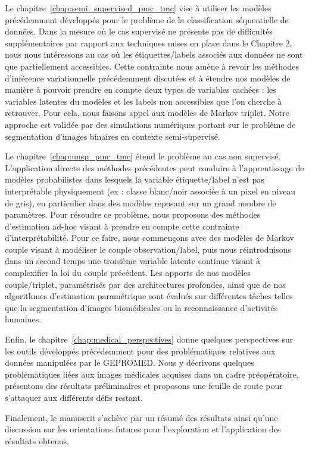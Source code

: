 Le chapitre~\ref{chap:semi_supervised_pmc_tmc}  
vise à utiliser les modèles précédemment développés pour le problème de la
classification séquentielle de données. Dans la mesure où le cas supervisé ne
présente pas de difficultés supplémentaires par rapport aux techniques mises en
place dans le Chapitre 2, nous nous intéressons au cas où les étiquettes/labels
associés aux données ne sont que partiellement accessibles. Cette contrainte
nous amène à revoir les méthodes d'inférence variationnelle précédemment
discutées et à étendre nos modèles de manière à pouvoir prendre en compte deux
types de variables cachées : les variables latentes du modèles et les labels non
accessibles que l'on cherche à retrouver. Pour cela, nous faisons appel aux
modèles de Markov triplet. Notre approche est validée par des simulations
numériques portant sur le problème de segmentation d'images binaires en contexte
semi-supervisé.




Le chapitre~\ref{chap:unsp_pmc_tmc} 
étend le problème au cas non supervisé. L'application directe des méthodes
précédentes peut conduire à l'apprentissage de modèles probabilistes dans
lesquels la variable étiquette/label n'est pas interprétable physiquement (ex :
classe blanc/noir associée à un pixel en niveau de gris), en particulier dans
des modèles reposant sur un grand nombre de paramètres. Pour résoudre ce
problème, nous proposons des méthodes d'estimation ad-hoc visant à prendre en
compte cette contrainte d'interprétabilité. Pour ce faire, nous commençons avec
des modèles de Markov couple visant à modéliser le couple observation/label,
puis nous réintroduisons dans un second temps une troisième variable latente
continue visant à complexifier la loi du couple précédent. Les apports de nos
modèles couple/triplet, paramétrisés par des architectures profondes, ainsi que
de nos algorithmes d'estimation paramétrique sont évalués sur différentes tâches
telles que la segmentation d'images biomédicales ou la reconnaissance
d'activités humaines.

Enfin, le chapitre~\ref{chap:medical_perspectives}  
 donne quelques perspectives sur les outils développés précédemment pour des
problématiques relatives aux données manipulées par le GEPROMED. Nous y
décrivons quelques problématiques liées aux images médicales acquises dans un
cadre préopératoire, présentons des résultats préliminaires et proposons une
feuille de route pour s'attaquer aux différents défis restant. 


Finalement, le manuscrit s'achève par un résumé des résultats ainsi qu'une discussion
sur les orientations futures pour l'exploration et l'application des résultats
obtenus.

